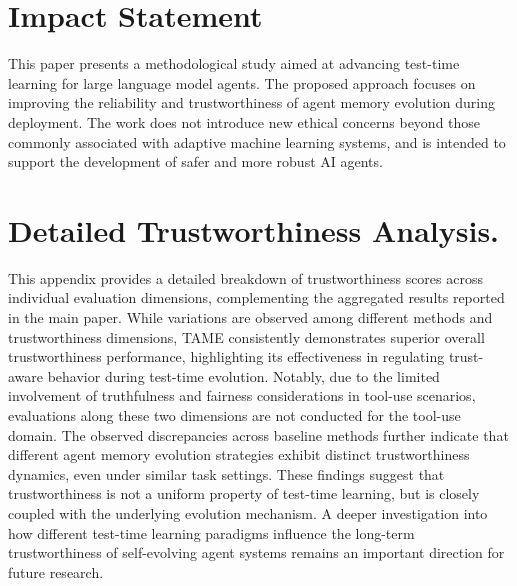 \documentclass{article}
\theoremstyle{plain}
\theoremstyle{definition}
\theoremstyle{remark}
\begin{document}



\section*{Impact Statement}

This paper presents a methodological study aimed at advancing test-time learning for large language model agents. The proposed approach focuses on improving the reliability and trustworthiness of agent memory evolution during deployment. The work does not introduce new ethical concerns beyond those commonly associated with adaptive machine learning systems, and is intended to support the development of safer and more robust AI agents.






\newpage
\appendix
\onecolumn
\section{Detailed Trustworthiness Analysis.}
\label{appendixA}

This appendix provides a detailed breakdown of trustworthiness scores across individual evaluation dimensions, complementing the aggregated results reported in the main paper. While variations are observed among different methods and trustworthiness dimensions, TAME consistently demonstrates superior overall trustworthiness performance, highlighting its effectiveness in regulating trust-aware behavior during test-time evolution. Notably, due to the limited involvement of truthfulness and fairness considerations in tool-use scenarios, evaluations along these two dimensions are not conducted for the tool-use domain. The observed discrepancies across baseline methods further indicate that different agent memory evolution strategies exhibit distinct trustworthiness dynamics, even under similar task settings. These findings suggest that trustworthiness is not a uniform property of test-time learning, but is closely coupled with the underlying evolution mechanism. A deeper investigation into how different test-time learning paradigms influence the long-term trustworthiness of self-evolving agent systems remains an important direction for future research.
\end{document}
